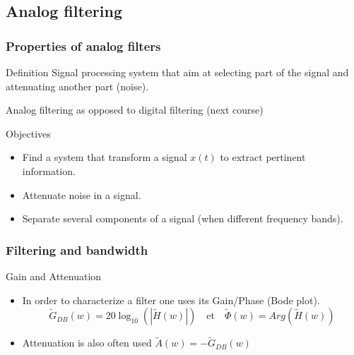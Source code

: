 \subsection{Analog filtering}
\label{sec:analogfiltering}

\subsubsection{Properties of analog filters}

\begin{block}{Definition}
    Signal processing system that aim at selecting part of the signal and attenuating another part (noise).

Analog filtering as opposed to digital filtering (next course)
  \end{block}


  \begin{block}{Objectives}
    \begin{itemize}
    \item Find a system that transform a signal $x(t)$ to extract pertinent information.
    \item Attenuate noise in a  signal.
    \item Separate several components of a signal (when different frequency bands).
    \end{itemize}
  \end{block}

  \frametitle{Filtering and bandwidth}

  \begin{block}{Gain and Attenuation}

    \begin{itemize}
    \item In order to characterize a filter one uses its 
    Gain/Phase (Bode plot).
$$\tilde G_{DB}(w)=20\log_{10}(|\tilde H(w)|)\quad \text{et}\quad
\tilde \Phi(w)=Arg(\tilde H(w))$$
     \item Attenuation is also often used $\tilde A(w)=-\tilde G_{DB}(w)$
 \end{itemize}
  \end{block}\vspace{-1mm}


